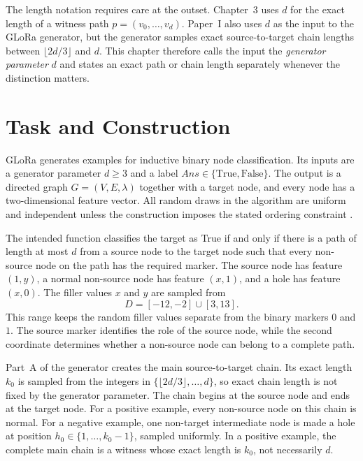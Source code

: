 The length notation requires care at the outset.
Chapter~3 uses $d$ for the exact length of a witness path $p=(v_0,\ldots,v_d)$.
Paper~I also uses $d$ as the input to the GLoRa generator, but the generator samples exact source-to-target chain lengths between $\lfloor 2d/3\rfloor$ and $d$.
This chapter therefore calls the input the \emph{generator parameter} $d$ and states an exact path or chain length separately whenever the distinction matters.

\section{Task and Construction}
\label{sec:glora-path-aware}
\label{sec:glora-design}
\label{sec:glora-shortcuts}

GLoRa generates examples for inductive binary node classification.
Its inputs are a generator parameter $d\geq 3$ and a label $\mathit{Ans}\in\{\mathrm{True},\mathrm{False}\}$.
The output is a directed graph $G=(V,E,\lambda)$ together with a target node, and every node has a two-dimensional feature vector.
All random draws in the algorithm are uniform and independent unless the construction imposes the stated ordering constraint \cite{zhou2025glora}.

The intended function classifies the target as True if and only if there is a path of length at most $d$ from a source node to the target node such that every non-source node on the path has the required marker.
The source node has feature $(1,y)$, a normal non-source node has feature $(x,1)$, and a hole has feature $(x,0)$.
The filler values $x$ and $y$ are sampled from
\[
  D=[-12,-2]\cup[3,13].
\]
This range keeps the random filler values separate from the binary markers $0$ and $1$.
The source marker identifies the role of the source node, while the second coordinate determines whether a non-source node can belong to a complete path.

Part~A of the generator creates the main source-to-target chain.
Its exact length $k_0$ is sampled from the integers in $\{\lfloor 2d/3\rfloor,\ldots,d\}$, so exact chain length is not fixed by the generator parameter.
The chain begins at the source node and ends at the target node.
For a positive example, every non-source node on this chain is normal.
For a negative example, one non-target intermediate node is made a hole at position $h_0\in\{1,\ldots,k_0-1\}$, sampled uniformly.
In a positive example, the complete main chain is a witness whose exact length is $k_0$, not necessarily $d$.

